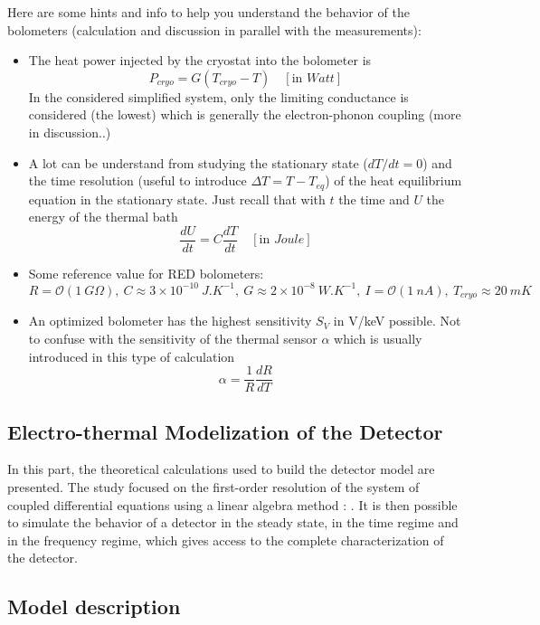 Here are some hints and info to help you understand the behavior of the bolometers (calculation and discussion in parallel with the measurements):
\begin{itemize}
	\item The heat power injected by the cryostat into the bolometer is $$P_{cryo} = G \left( T_{cryo} - T\right) \quad [\textrm{in } Watt]$$ In the considered simplified system, only the limiting conductance is considered (the lowest) which is generally the electron-phonon coupling (more in discussion..)
	\item A lot can be understand from studying the stationary state ($dT/dt=0$) and the time resolution (useful to introduce $\Delta T = T - T_{eq}$) of the heat equilibrium equation in the stationary state. Just recall that with $t$ the time and $U$ the energy of the thermal bath $$\frac{dU}{dt} = C \frac{dT}{dt} \quad [\textrm{in }  Joule]$$
	\item Some reference value for RED bolometers:
	$$ R = \mathcal{O}(1 \ G\Omega),\
	C \approx 3 \times 10^{-10} \ J.K^{-1},\
	G \approx 2 \times 10^{-8} \ W.K^{-1},\
	I = \mathcal{O}(1 \ nA),\
	T_{cryo} \approx 20 \ mK $$
	\item An optimized bolometer has the highest sensitivity $S_V$ in V/keV possible. Not to confuse with the sensitivity of the thermal sensor $\alpha$ which is usually introduced in this type of calculation 
	$$\alpha = \frac{1}{R} \frac{dR}{dT} $$
\end{itemize}


\subsection{Electro-thermal Modelization of the Detector}

In this part, the theoretical calculations used to build the detector model are presented. The study focused on the first-order resolution of the system of coupled differential equations using a linear algebra method : \cite{matrix}. It is then possible to simulate the behavior of a detector in the steady state, in the time regime and in the frequency regime, which gives access to the complete characterization of the detector.


\subsection{Model description}

